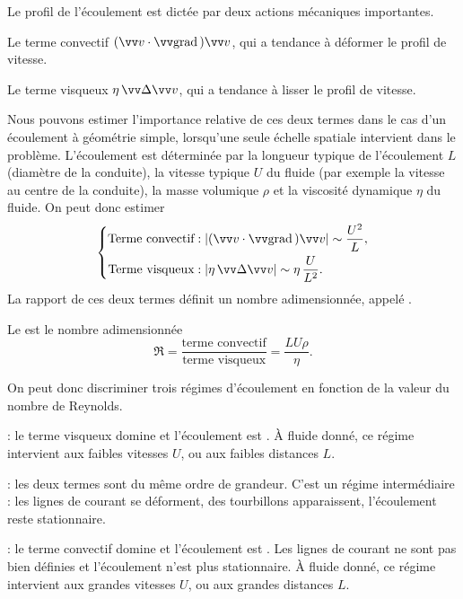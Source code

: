 \documentclass[12pt,fancy]{cours}
\begin{document}
Le profil de l'écoulement est dictée par deux actions mécaniques importantes.
\begin{liste}
	\item Le terme convectif $(\Vec{v}\cdot\grad)\Vec{v}$, qui a tendance à déformer le profil de vitesse.
	\item Le terme visqueux $\eta\,\Deltav{v}$, qui a tendance à lisser le profil de vitesse.
\end{liste}
Nous pouvons estimer l'importance relative de ces deux termes dans le cas d'un écoulement à géométrie simple, lorsqu'une seule échelle spatiale intervient dans le problème. L'écoulement est déterminée par la longueur typique de l'écoulement $L$ (diamètre de la conduite), la vitesse typique $U$ du fluide (par exemple la vitesse au centre de la conduite), la masse volumique $\rho$ et la viscosité dynamique $\eta$ du fluide. On peut donc estimer 
\begin{equation}
	\left\{
\begin{split}
\text{Terme convectif} &: |(\Vec{v}\cdot\grad)\Vec{v}| \sim \frac{U^2}{L},\\
\text{Terme visqueux} &: |\eta\,\Deltav{v}| \sim \eta\,\frac{U}{L^2}.
\end{split}
	\right.
\end{equation}
La rapport de ces deux termes définit un nombre adimensionnée, appelé .
\begin{definition}
Le  est le nombre adimensionnée
\begin{equation}
\Re = \frac{\text{terme convectif}}{\text{terme visqueux}} = \frac{LU\rho}{\eta}.
\end{equation}
\end{definition}
On peut donc discriminer trois régimes d'écoulement en fonction de la valeur du nombre de Reynolds.
\begin{liste}
	\item {} : le terme visqueux domine et l'écoulement est . À fluide donné, ce régime intervient aux faibles vitesses $U$, ou aux faibles distances $L$.
	\item {} : les deux termes sont du même ordre de grandeur. C'est un régime intermédiaire : les lignes de courant se déforment, des tourbillons apparaissent, l'écoulement reste stationnaire.
	\item {} : le terme convectif domine et l'écoulement est . Les lignes de courant ne sont pas bien définies et l'écoulement n'est plus stationnaire.
	À fluide donné, ce régime intervient aux grandes vitesses $U$, ou aux grandes distances $L$.
\end{liste}
\end{document}
